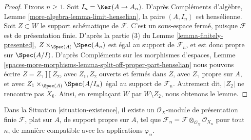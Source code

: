\begin{proof}
Fixons $n \geq 1$. Soit $I_n = \Ker(A \to A_n)$.
D'après Compléments d'algèbre, Lemme \ref{more-algebra-lemma-limit-henselian},
la paire $(A, I_n)$ est hensélienne.
Soit $Z \subset W$ le support schématique de $\mathcal{F}$.
C'est un sous-espace fermé, puisque $\mathcal{F}$ est de présentation finie.
D'après la partie (3) du Lemme \ref{lemma-finitely-presented},
$Z \times_{\Spec(A)} \Spec(A_n)$
est égal au support de $\mathcal{F}_n$, et est donc
propre sur $\Spec(A/I)$.
D'après Compléments sur les morphismes d'espaces, Lemme
\ref{spaces-more-morphisms-lemma-split-off-proper-part-henselian}
nous pouvons écrire $Z = Z_1 \amalg Z_2$, avec $Z_1, Z_2$ ouverts et
fermés dans $Z$, avec $Z_1$ propre
sur $A$, et avec $Z_1 \times_{\Spec(A)} \Spec(A/I_n)$
égal au support de $\mathcal{F}_n$.
Autrement dit, $|Z_2|$ ne rencontre pas $X_0$.
Ainsi, en remplaçant $W$ par $W \setminus Z_2$, nous obtenons le lemme.
\end{proof}

\begin{theorem}
\label{theorem-existence}
Dans la Situation \ref{situation-existence},
il existe un $\mathcal{O}_X$-module de présentation finie
$\mathcal{F}$, plat sur $A$, de support propre sur $A$,
tel que
$\mathcal{F}_n = \mathcal{F} \otimes_{\mathcal{O}_X} \mathcal{O}_{X_n}$
pour tout $n$, de manière compatible avec les applications $\varphi_n$.
\end{theorem}

